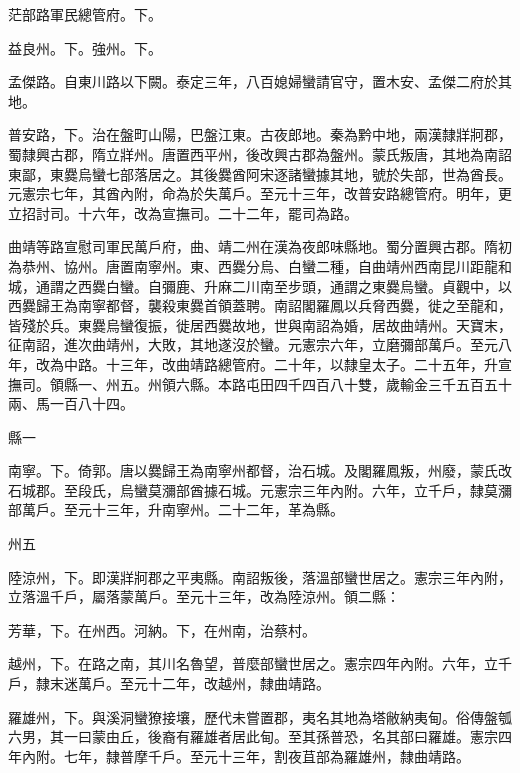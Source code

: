 \begin{pinyinscope}
 茫部路軍民總管府。下。



 益良州。下。強州。下。



 孟傑路。自東川路以下闕。泰定三年，八百媳婦蠻請官守，置木安、孟傑二府於其地。



 普安路，下。治在盤町山陽，巴盤江東。古夜郎地。秦為黔中地，兩漢隸牂牁郡，蜀隸興古郡，隋立牂州。唐置西平州，後改興古郡為盤州。蒙氏叛唐，其地為南詔東鄙，東爨烏蠻七部落居之。其後爨酋阿宋逐諸蠻據其地，號於失部，世為酋長。元憲宗七年，其酋內附，命為於失萬戶。至元十三年，改普安路總管府。明年，更立招討司。十六年，改為宣撫司。二十二年，罷司為路。



 曲靖等路宣慰司軍民萬戶府，曲、靖二州在漢為夜郎味縣地。蜀分置興古郡。隋初為恭州、協州。唐置南寧州。東、西爨分烏、白蠻二種，自曲靖州西南昆川距龍和城，通謂之西爨白蠻。自彌鹿、升麻二川南至步頭，通謂之東爨烏蠻。貞觀中，以西爨歸王為南寧都督，襲殺東爨首領蓋聘。南詔閣羅鳳以兵脅西爨，徙之至龍和，皆殘於兵。東爨烏蠻復振，徙居西爨故地，世與南詔為婚，居故曲靖州。天寶末，征南詔，進次曲靖州，大敗，其地遂沒於蠻。元憲宗六年，立磨彌部萬戶。至元八年，改為中路。十三年，改曲靖路總管府。二十年，以隸皇太子。二十五年，升宣撫司。領縣一、州五。州領六縣。本路屯田四千四百八十雙，歲輸金三千五百五十兩、馬一百八十四。



 縣一



 南寧。下。倚郭。唐以爨歸王為南寧州都督，治石城。及閣羅鳳叛，州廢，蒙氏改石城郡。至段氏，烏蠻莫瀰部酋據石城。元憲宗三年內附。六年，立千戶，隸莫瀰部萬戶。至元十三年，升南寧州。二十二年，革為縣。



 州五



 陸涼州，下。即漢牂牁郡之平夷縣。南詔叛後，落溫部蠻世居之。憲宗三年內附，立落溫千戶，屬落蒙萬戶。至元十三年，改為陸涼州。領二縣：



 芳華，下。在州西。河納。下，在州南，治蔡村。



 越州，下。在路之南，其川名魯望，普麼部蠻世居之。憲宗四年內附。六年，立千戶，隸末迷萬戶。至元十二年，改越州，隸曲靖路。



 羅雄州，下。與溪洞蠻獠接壤，歷代未嘗置郡，夷名其地為塔敝納夷甸。俗傳盤瓠六男，其一曰蒙由丘，後裔有羅雄者居此甸。至其孫普恐，名其部曰羅雄。憲宗四年內附。七年，隸普摩千戶。至元十三年，割夜苴部為羅雄州，隸曲靖路。




\end{pinyinscope}
